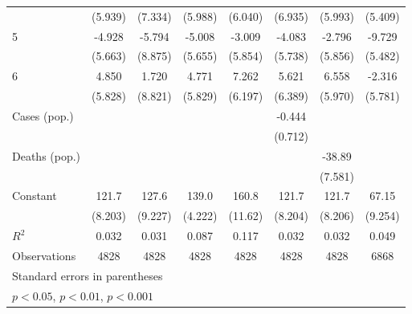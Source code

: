 \documentclass{article}
\begin{document}
{\begin{longtable}{l*{7}{c}}
                &  (5.939)         &  (7.334)         &  (5.988)         &  (6.040)         &  (6.935)         &  (5.993)         &  (5.409)         \\
5               &   -4.928         &   -5.794         &   -5.008         &   -3.009         &   -4.083         &   -2.796         &   -9.729         \\
                &  (5.663)         &  (8.875)         &  (5.655)         &  (5.854)         &  (5.738)         &  (5.856)         &  (5.482)         \\
6               &    4.850         &    1.720         &    4.771         &    7.262         &    5.621         &    6.558         &   -2.316         \\
                &  (5.828)         &  (8.821)         &  (5.829)         &  (6.197)         &  (6.389)         &  (5.970)         &  (5.781)         \\
Cases (pop.)    &                  &                  &                  &                  &   -0.444         &                  &                  \\
                &                  &                  &                  &                  &  (0.712)         &                  &                  \\
Deaths (pop.)   &                  &                  &                  &                  &                  &   -38.89\sym{***}&                  \\
                &                  &                  &                  &                  &                  &  (7.581)         &                  \\
Constant        &    121.7\sym{***}&    127.6\sym{***}&    139.0\sym{***}&    160.8\sym{***}&    121.7\sym{***}&    121.7\sym{***}&    67.15\sym{***}\\
                &  (8.203)         &  (9.227)         &  (4.222)         &  (11.62)         &  (8.204)         &  (8.206)         &  (9.254)         \\
\hline
\(R^{2}\)       &    0.032         &    0.031         &    0.087         &    0.117         &    0.032         &    0.032         &    0.049         \\
Observations    &     4828         &     4828         &     4828         &     4828         &     4828         &     4828         &     6868         \\
\hline\hline
\multicolumn{8}{l}{\footnotesize Standard errors in parentheses}\\
\multicolumn{8}{l}{\footnotesize \sym{*} \(p<0.05\), \sym{**} \(p<0.01\), \sym{***} \(p<0.001\)}\\
\end{longtable}
}
\end{document}
